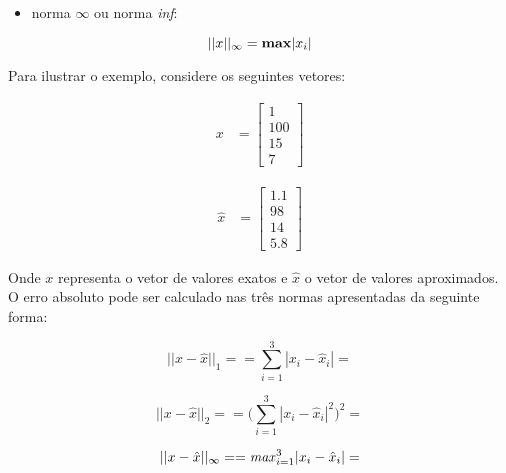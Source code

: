 \begin{itemize}
 \item norma $\infty$ ou norma \textit{inf}:
\end{itemize}

\begin{equation}
 ||x||_{\infty} = \text{\textbf{max}} |x_i|
\end{equation}

Para ilustrar o exemplo, considere os seguintes vetores:

\begin{align}
 x &= 
  \begin{bmatrix}
   1   \\
   100 \\
   15  \\
   7   
  \end{bmatrix}
\end{align}

\begin{align}
\hat{x} &= \begin{bmatrix}
  1.1  \\
  98   \\
  14   \\
  5.8   
\end{bmatrix}
\end{align}

Onde $x$ representa o vetor de valores exatos e $\hat{x}$ o vetor de
valores aproximados. O erro absoluto pode ser calculado nas três normas
apresentadas da seguinte forma:

\begin{equation}
 ||x - \hat{x}||_1 =  
 = 
 \sum_{i=1}^{3} |x_i - \hat{x}_i|
 =
\end{equation}

\begin{equation}
 ||x - \hat{x}||_2 =  
 = 
 \bigg( \sum_{i=1}^{3} |x_i - \hat{x}_i|^2 \bigg)^2
 =
\end{equation}

\begin{equation}
 ||x - \hat{x}||_{\infty} =  
 = 
 \text{\textit{max}}_{i=1}^{3} |x_i - \hat{x}_i|
 =
\end{equation}



